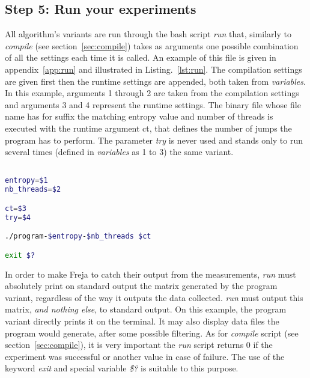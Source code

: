 \subsection{Step 5: Run your experiments}
\label{sec:run}
All algorithm's variants are run through the bash script \emph{run} that, similarly to \emph{compile} (see section~\ref{sec:compile}) takes as arguments one possible combination of all the settings each time it is called. An example of this file is given in appendix~\ref{app:run} and illustrated in Listing.~\ref{lst:run}. The compilation settings are given first then the runtime settings are appended, both taken from \emph{variables}. In this example, arguments 1 through 2 are taken from the compilation settings and arguments 3 and 4 represent the runtime settings. The binary file whose file name has for suffix the matching entropy value and number of threads is executed with the runtime argument ct, that defines the number of jumps the program has to perform. The parameter \emph{try} is never used and stands only to run several times (defined in \emph{variables} as 1 to 3) the same variant.

\begin{lstlisting}[caption={\emph{run} catches the compilation settings first, then the run settings and run the right binary with relevant parameters.},label={lst:run},language=bash]

entropy=$1
nb_threads=$2

ct=$3
try=$4

./program-$entropy-$nb_threads $ct

exit $?
\end{lstlisting}

In order to make Freja to catch their output from the measurements, \emph{run} must absolutely print on standard output the matrix generated by the program variant, regardless of the way it outputs the data collected. \emph{run} must output this matrix, \emph{and nothing else}, to standard output. On this example, the program variant directly prints it on the terminal. It may also display data files the program would generate, after some possible filtering. As for \emph{compile} script (see section~\ref{sec:compile}), it is very important the \emph{run} script returns 0 if the experiment was successful or another value in case of failure. The use of the keyword \emph{exit} and special variable \emph{\$?} is suitable to this purpose.

